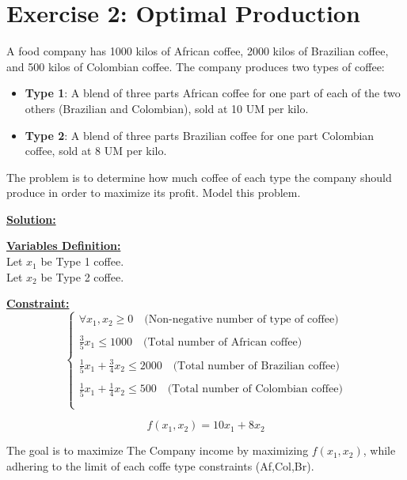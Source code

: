 
\section*{Exercise 2: Optimal Production}

A food company has 1000 kilos of African coffee, 2000 kilos of Brazilian coffee, and 500 kilos of Colombian coffee. The company produces two types of coffee:

\begin{itemize}
    \item \textbf{Type 1}: A blend of three parts African coffee for one part of each of the two others (Brazilian and Colombian), sold at 10 UM per kilo.
    \item \textbf{Type 2}: A blend of three parts Brazilian coffee for one part Colombian coffee, sold at 8 UM per kilo.
\end{itemize}

The problem is to determine how much coffee of each type the company should produce in order to maximize its profit. Model this problem.

\vspace{1.5cm}
\textbf{\underline{\Large Solution:}}

\vspace{0.5cm}
\begin{minipage}[t]{0.45\textwidth}
    \textbf{\underline{Variables Definition:}} \\[1em] %

    Let \(x_1\) be Type 1 coffee. \\
   
    Let \(x_2\) be Type 2 coffee.
\end{minipage}%
\hfill %
\begin{minipage}[t]{0.45\textwidth}
    \textbf{\underline{Constraint:}} \\[1em]
    \[
    \left\{
        \begin{array}{l}
            \forall x_1, x_2 \geq 0 \quad \text{(Non-negative number of type of coffee)}\\\\
            \frac{3}{5} x_1  \leq 1000 \quad \text{(Total number of African coffee)}\\\\
            \frac{1}{5}x_1 + \frac{3}{4}x_2 \leq 2000 \quad \text{(Total number of Brazilian coffee)}\\\\
            \frac{1}{5}x_1 + \frac{1}{4}x_2 \leq 500 \quad \text{(Total number of Colombian coffee)}\\\\
        \end{array}
    \right.
    \]
\end{minipage}
\vspace{0.5cm}
\begin{tcolorbox}[title = Objectif Function]
\[
f(x_1,x_2) = 10x_1 + 8x_2 
\]
\begin{center}
The goal is to maximize The Company income by maximizing \(f(x_1,x_2)\), while adhering to the limit of each coffe type constraints (Af,Col,Br).
\end{center}
\end{tcolorbox}
